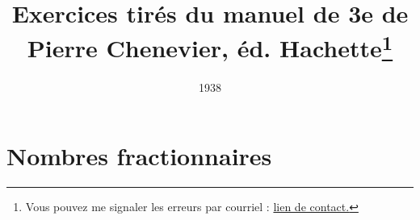 \documentclass[12 pt]{report}
\author{ }
\title{\Large Exercices tirés du manuel de 3e de Pierre Chenevier, éd. Hachette\footnote{Vous pouvez me signaler les erreurs par courriel : \href{mailto:leturcq.d@orange.fr}{lien de contact.} 
	}
	}
\date{1938}
\theoremstyle{plain}
\newcounter{n}
\begin{document}
	\maketitle 
	
	
%	
% 
% 
% 
% 
% 
% 
% 
% 
\part{Nombres fractionnaires}
 
 
 
 
 
 
 
 
%  
% 
% 
% 
% 
% 
% 
% 
% 
% 
% 
% 
% 
% 
% 
% 
% 
% 
% 
% 
 
 
 	
\end{document}
